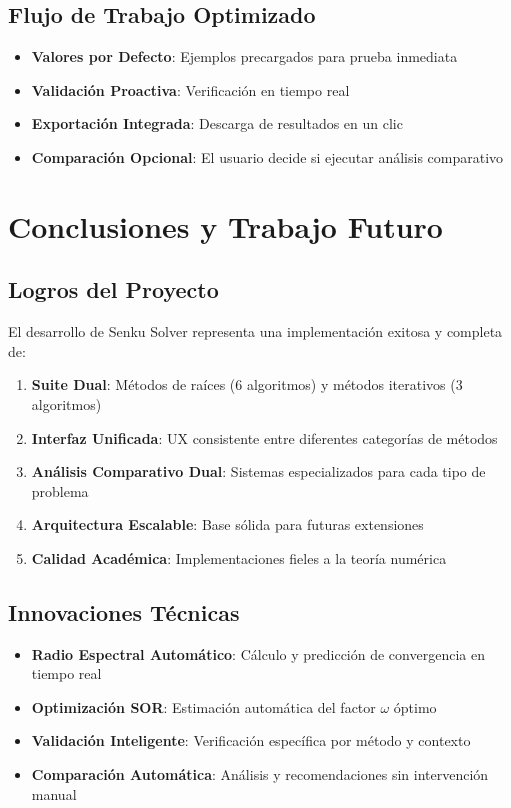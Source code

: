 \subsection{Flujo de Trabajo Optimizado}

\begin{itemize}
    \item \textbf{Valores por Defecto}: Ejemplos precargados para prueba inmediata
    \item \textbf{Validación Proactiva}: Verificación en tiempo real
    \item \textbf{Exportación Integrada}: Descarga de resultados en un clic
    \item \textbf{Comparación Opcional}: El usuario decide si ejecutar análisis comparativo
\end{itemize}

\section{Conclusiones y Trabajo Futuro}

\subsection{Logros del Proyecto}

El desarrollo de Senku Solver representa una implementación exitosa y completa de:

\begin{enumerate}
    \item \textbf{Suite Dual}: Métodos de raíces (6 algoritmos) y métodos iterativos (3 algoritmos)
    \item \textbf{Interfaz Unificada}: UX consistente entre diferentes categorías de métodos
    \item \textbf{Análisis Comparativo Dual}: Sistemas especializados para cada tipo de problema
    \item \textbf{Arquitectura Escalable}: Base sólida para futuras extensiones
    \item \textbf{Calidad Académica}: Implementaciones fieles a la teoría numérica
\end{enumerate}

\subsection{Innovaciones Técnicas}

\begin{itemize}
    \item \textbf{Radio Espectral Automático}: Cálculo y predicción de convergencia en tiempo real
    \item \textbf{Optimización SOR}: Estimación automática del factor $\omega$ óptimo
    \item \textbf{Validación Inteligente}: Verificación específica por método y contexto
    \item \textbf{Comparación Automática}: Análisis y recomendaciones sin intervención manual
\end{itemize}

